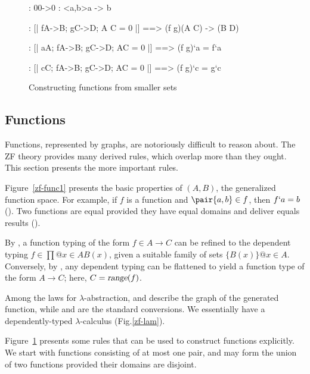 \begin{figure}
\begin{alltt*}\isastyleminor
{}:           0\isasymin{}0->0
:          {\ttlbrace}<a,b>{\ttrbrace}\isasymin{}{\ttlbrace}a{\ttrbrace} -> {\ttlbrace}b{\ttrbrace}

:     [| f\isasymin{}A->B; g\isasymin{}C->D; A \isasyminter C = 0  |] ==>  
                     (f \isasymunion g)\isasymin{}(A \isasymunion C) -> (B \isasymunion D)

: [| a\isasymin{}A; f\isasymin{}A->B; g\isasymin{}C->D;  A\isasyminter{}C = 0 |] ==>  
                     (f \isasymunion g)`a = f`a

: [| c\isasymin{}C; f\isasymin{}A->B; g\isasymin{}C->D;  A\isasyminter{}C = 0 |] ==>  
                     (f \isasymunion g)`c = g`c
\end{alltt*}
\caption{Constructing functions from smaller sets} \label{zf-func2}
\end{figure}


\subsection{Functions}
Functions, represented by graphs, are notoriously difficult to reason
about.  The ZF theory provides many derived rules, which overlap more
than they ought.  This section presents the more important rules.

Figure~\ref{zf-func1} presents the basic properties of $(A,B)$,
the generalized function space.  For example, if $f$ is a function and
$\pair{a,b}\in f$, then $f`a=b$ ().  Two functions
are equal provided they have equal domains and deliver equals results
().

By , a function typing of the form $f\in A\to C$ can be
refined to the dependent typing $f\in\prod@{x\in A}B(x)$, given a suitable
family of sets $\{B(x)\}@{x\in A}$.  Conversely, by ,
any dependent typing can be flattened to yield a function type of the form
$A\to C$; here, $C=\emph{\sl range}(f)$.

Among the laws for $\lambda$-abstraction,  and 
describe the graph of the generated function, while  and
 are the standard conversions.  We essentially have a
dependently-typed $\lambda$-calculus (Fig.\ts\ref{zf-lam}).

Figure~\ref{zf-func2} presents some rules that can be used to construct
functions explicitly.  We start with functions consisting of at most one
pair, and may form the union of two functions provided their domains are
disjoint.  


